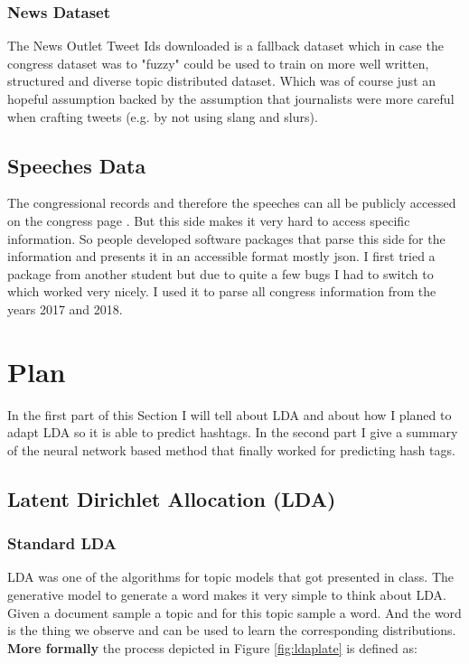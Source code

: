 \documentclass[10pt,conference,compsocconf]{IEEEtran}
\begin{document}
\subsubsection{News Dataset}
The News Outlet Tweet Ids downloaded is a fallback dataset which in case the congress dataset was to "fuzzy" could be used to train on more well written, structured and diverse topic distributed dataset. Which was of course just an hopeful assumption backed by the assumption that journalists were more careful when crafting tweets (e.g. by not using slang and slurs). 
\subsection{Speeches Data}
The congressional records and therefore the speeches can all be publicly accessed on the congress page \cite{congress_page}. But this side makes it very hard to access specific information. So people developed software packages that parse this side for the information and presents it in an accessible format mostly json. I first tried a package from another student but due to quite a few bugs I had to switch to \cite{congress-downloader} which worked very nicely. I used it to parse all congress information from the years 2017 and 2018. 


\section{Plan}
\label{sec:Plan}
In the first part of this Section I will tell about LDA and about how I planed to adapt LDA so it is able to predict hashtags. In the second part I give a summary of the neural network based method that finally worked for predicting hash tags. 
\subsection{Latent Dirichlet Allocation (LDA)}
\subsubsection{Standard LDA}
LDA was one of the algorithms for topic models that got presented in class. The generative model to generate a word makes it very simple to think about LDA. Given a document sample a topic and for this topic sample a word. And the word is the thing we observe and can be used to learn the corresponding distributions. \\
\textbf{More formally} the process depicted in Figure \ref{fig:ldaplate} is defined as: 
\end{document}
